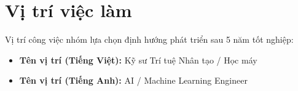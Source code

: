 \section{Vị trí việc làm}

Vị trí công việc nhóm lựa chọn định hướng phát triển sau 5 năm tốt nghiệp:

\begin{itemize}
    \item \textbf{Tên vị trí (Tiếng Việt):} Kỹ sư Trí tuệ Nhân tạo / Học máy
    \item \textbf{Tên vị trí (Tiếng Anh):} AI / Machine Learning Engineer
\end{itemize}
